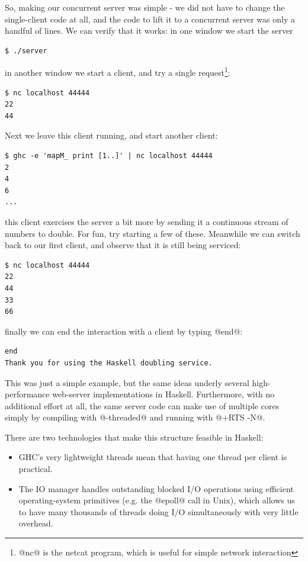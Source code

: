So, making our concurrent server was simple - we did not have to
change the single-client code at all, and the code to lift it to a
concurrent server was only a handful of lines.  We can verify that it
works: in one window we start the server

\begin{verbatim}
$ ./server
\end{verbatim}

\noindent in another window we start a client, and try a single
request\footnote{@nc@ is the netcat program, which is useful for simple network
  interaction}:

\begin{verbatim}
$ nc localhost 44444
22
44
\end{verbatim}

\noindent Next we leave this client running, and start another client:

\begin{verbatim}
$ ghc -e 'mapM_ print [1..]' | nc localhost 44444
2
4
6
...
\end{verbatim}

\noindent this client exercises the server a bit more by sending it a
continuous stream of numbers to double.  For fun, try starting a few
of these.  Meanwhile we can switch back to our first client, and
observe that it is still being serviced:

\begin{verbatim}
$ nc localhost 44444
22
44
33
66
\end{verbatim}

\noindent finally we can end the interaction with a client by typing
@end@:

\begin{verbatim}
end
Thank you for using the Haskell doubling service.
\end{verbatim}

This was just a simple example, but the same ideas underly several
high-performance web-server implementations in Haskell.  Furthermore,
with no additional effort at all, the same server code can make use of
multiple cores simply by compiling with @-threaded@ and running with
@+RTS -N@.

There are two technologies that make this structure feasible in
Haskell:

\begin{itemize}
\item GHC's very lightweight threads mean that having one thread per
  client is practical.
\item The IO manager \cite{io-manager} handles outstanding blocked I/O
  operations using efficient operating-system primitives (e.g. the
  @epoll@ call in Unix), which allows us to have many thousands of
  threads doing I/O simultaneously with very little overhead.
\end{itemize}

